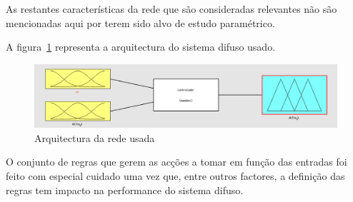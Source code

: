 \documentclass{article}
\begin{document}
As restantes características da rede que são consideradas relevantes não são mencionadas aqui por terem sido alvo de estudo paramétrico.

A figura~\ref{nn_architecture} representa a arquitectura do sistema difuso usado.

\begin{figure}[!h]
  \centering
  \includegraphics[width=5in]{figures/nn_architecture}
  \caption{Arquitectura da rede usada}
  \label{nn_architecture}
\end{figure}

O conjunto de regras que gerem as acções a tomar em função das entradas foi feito com especial cuidado uma vez que, entre outros factores, a definição das regras tem impacto na performance do sistema difuso.
\end{document}
